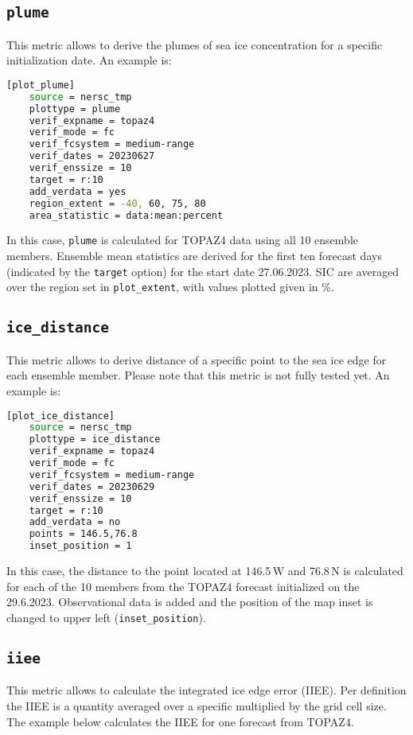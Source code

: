 \documentclass[DIV=10, parskip=full]{scrreprt}
\newcommand{\notimplement}[1]{#1}
\begin{document}
\subsection{\texttt{plume}}
This metric allows to derive the plumes of  sea ice concentration for a specific initialization date. An example is:

\begin{lstlisting}[language=bash]
	[plot_plume]
	source = nersc_tmp   
	plottype = plume 
	verif_expname = topaz4 
	verif_mode = fc
	verif_fcsystem = medium-range
	verif_dates = 20230627
	verif_enssize = 10
	target = r:10
	add_verdata = yes
	region_extent = -40, 60, 75, 80
	area_statistic = data:mean:percent
\end{lstlisting}

In this case, \texttt{plume} is calculated for TOPAZ4 data using all 10 ensemble members. Ensemble mean statistics are derived for the first ten forecast days (indicated by the \texttt{target} option) for the start date 27.06.2023. SIC are averaged over the region set in \texttt{plot\_extent}, with values plotted given in \%.

\subsection{\texttt{ice\_distance}}
This metric allows to derive distance of a specific point to the sea ice edge for each ensemble member. \notimplement{Please note that this metric is not fully tested yet. An example is}:

\begin{lstlisting}[language=bash]
	[plot_ice_distance]
	source = nersc_tmp
	plottype = ice_distance
	verif_expname = topaz4
	verif_mode = fc
	verif_fcsystem = medium-range
	verif_dates = 20230629
	verif_enssize = 10
	target = r:10
	add_verdata = no
	points = 146.5,76.8
	inset_position = 1
\end{lstlisting}

In this case, the distance to the point located at 146.5\,W and 76.8\,N is calculated for each of the 10 members from the TOPAZ4 forecast initialized on the 29.6.2023. Observational data is added and the position of the map inset is changed to upper left (\texttt{inset\_position}).


\subsection{\texttt{iiee}}
\label{subsec:iiee}
This metric allows to calculate the integrated ice edge error (IIEE). Per definition the IIEE is a quantity averaged over a specific multiplied by the grid cell size. The example below calculates the IIEE for one forecast from TOPAZ4.
\end{document}

